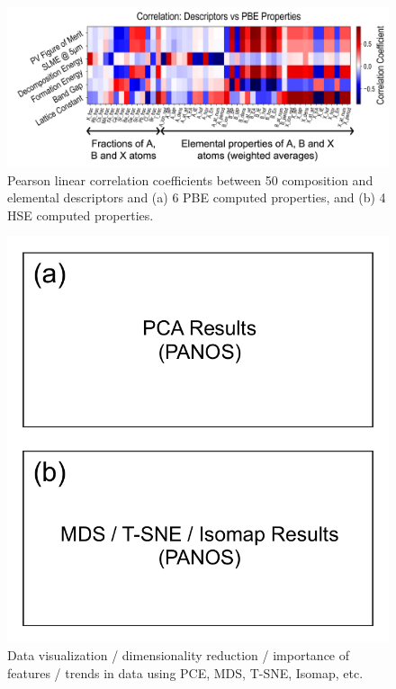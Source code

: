 \documentclass[twoside,twocolumn,9pt]{article}
\begin{document}
    \begin{figure}[h]
      \centering
      \includegraphics[width=0.99\linewidth]{Figure4.png}
      \caption{\label{Fig:outline} 
        Pearson linear correlation coefficients between 50 composition and
        elemental descriptors and (a) 6 PBE computed properties, and (b) 4
        HSE computed properties.
      }
    \end{figure}


    \begin{figure}[h]
      \centering
      \includegraphics[width=0.80\linewidth]{Figure5.pdf}
      \caption{\label{Fig:outline} 
        Data visualization / dimensionality reduction / importance of
        features / trends in data using PCE, MDS, T-SNE, Isomap, etc.
      }
    \end{figure}
\end{document}

